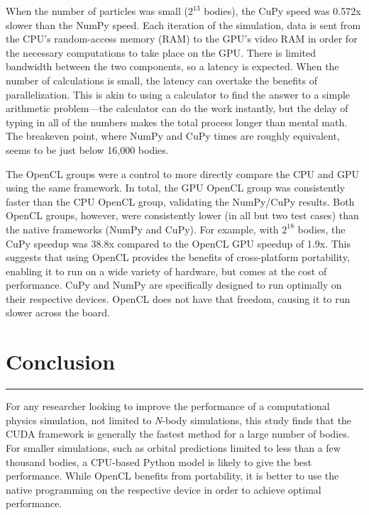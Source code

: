 \documentclass[12pt, letterpaper]{article}
\begin{document}
When the number of particles was small (\begin{math}2^{13}\end{math} 
bodies), the CuPy speed was 0.572x slower than the NumPy speed. Each 
iteration of the simulation, data is sent from the CPU's random-access 
memory (RAM) to the GPU's video RAM in order for the necessary 
computations to take place on the GPU. There is limited bandwidth between 
the two components, so a latency is expected. When the number of 
calculations is small, the latency can overtake the benefits of 
parallelization. This is akin to using a calculator to find the answer to 
a simple arithmetic problem—the calculator can do the work instantly, but 
the delay of typing in all of the numbers makes the total process longer 
than mental math. The breakeven point, where NumPy and CuPy times are 
roughly equivalent, seems to be just below 16,000 bodies.

The OpenCL groups were a control to more directly compare the CPU and GPU 
using the same framework. In total, the GPU OpenCL group was consistently 
faster than the CPU OpenCL group, validating the NumPy/CuPy results. Both 
OpenCL groups, however, were consistently lower (in all but two test 
cases) than the native frameworks (NumPy and CuPy). For example, with 
\begin{math}2^{18}\end{math} bodies, the CuPy speedup was 38.8x compared 
to the OpenCL GPU speedup of 1.9x. This suggests that using OpenCL 
provides the benefits of cross-platform portability, enabling it to run on 
a wide variety of hardware, but comes at the cost of performance. CuPy and 
NumPy are specifically designed to run optimally on their respective 
devices. OpenCL does not have that freedom, causing it to run slower 
across the board.

\section{Conclusion}
\vspace{1pt}\hrule\vspace{12pt}

For any researcher looking to improve the performance of a computational 
physics simulation, not limited to \textit{N}-body simulations, this study 
finds that the CUDA framework is generally the fastest method for a large 
number of bodies. For smaller simulations, such as orbital predictions 
limited to less than a few thousand bodies, a CPU-based Python model is 
likely to give the best performance. While OpenCL benefits from 
portability, it is better to use the native programming on the respective 
device in order to achieve optimal performance.
\end{document}
